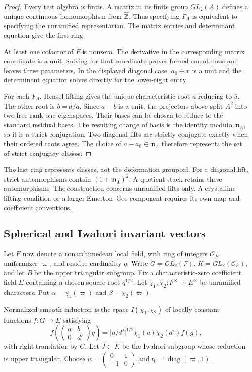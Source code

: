 \begin{proof}
Every test algebra is finite. A matrix in its finite group $GL_2(A)$
defines a unique continuous homomorphism from $\widehat{\mathbb Z}$.
Thus specifying $F_A$ is equivalent to specifying the unramified
representation. The matrix entries and determinant equation give the
first ring.

At least one cofactor of $\overline F$ is nonzero. The derivative in
the corresponding matrix coordinate is a unit. Solving for that
coordinate proves formal smoothness and leaves three parameters.
In the displayed diagonal case, $a_0+x$ is a unit and the determinant
equation solves directly for the lower-right entry.

For each $F_A$, Hensel lifting gives the unique characteristic root
$a$ reducing to $\bar a$. The other root is $b=d/a$.
Since $a-b$ is a unit, the projectors above split $A^2$ into two
free rank-one eigenspaces. Their bases can be chosen to reduce to the
standard residual bases. The resulting change of basis is the identity
modulo $\mathfrak m_A$, so it is a strict conjugation.
Two diagonal lifts are strictly conjugate exactly when their ordered
roots agree. The choice of $a-a_0\in\mathfrak m_A$ therefore represents
the set of strict conjugacy classes.
\end{proof}

The last ring represents classes, not the deformation groupoid.
For a diagonal lift, strict automorphisms contain
$(1+\mathfrak m_A)^2$. A quotient stack retains these automorphisms.
The construction concerns unramified lifts only. A crystalline lifting
condition or a larger Emerton--Gee component requires its own map and
coefficient conventions.

\subsection{Spherical and Iwahori invariant vectors}

Let $F$ now denote a nonarchimedean local field, with ring of integers
$\mathcal O_F$, uniformizer $\varpi$, and residue cardinality $q$.
Write $G=GL_2(F)$, $K=GL_2(\mathcal O_F)$, and let $B$ be the upper
triangular subgroup. Fix a characteristic-zero coefficient field $E$
containing a chosen square root $q^{1/2}$.
Let $\chi_1,\chi_2:F^\times\to E^\times$ be unramified characters.
Put $\alpha=\chi_1(\varpi)$ and $\beta=\chi_2(\varpi)$.

Normalized smooth induction is the space $I(\chi_1,\chi_2)$ of locally
constant functions $f:G\to E$ satisfying
\[
 f\left(\begin{pmatrix}a&b\\0&d'\end{pmatrix}g\right)
 =|a/d'|^{1/2}\chi_1(a)\chi_2(d')f(g),
\]
with right translation by $G$.
Let $J\subset K$ be the Iwahori subgroup whose reduction is upper
triangular. Choose
$w=\begin{pmatrix}0&1\\-1&0\end{pmatrix}$ and
$t_0=\operatorname{diag}(\varpi,1)$.

